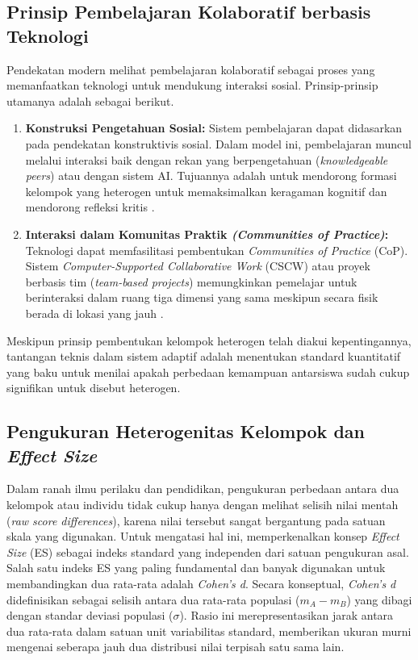 \subsection{Prinsip Pembelajaran Kolaboratif berbasis Teknologi}
\label{ssec:prinsip_cscl}
Pendekatan modern melihat pembelajaran
kolaboratif sebagai proses yang memanfaatkan teknologi untuk mendukung interaksi
sosial. Prinsip-prinsip utamanya adalah sebagai berikut.

\begin{enumerate}
    \item \textbf{Konstruksi Pengetahuan Sosial:} Sistem pembelajaran dapat didasarkan
    pada pendekatan konstruktivis sosial. Dalam model ini, pembelajaran muncul melalui
    interaksi baik dengan rekan yang berpengetahuan (\textit{knowledgeable peers})
    atau dengan sistem AI. Tujuannya adalah untuk mendorong formasi kelompok yang
    heterogen untuk memaksimalkan keragaman kognitif dan mendorong refleksi kritis
    \autocite{Halkiopoulos2024}.

    \item \textbf{Interaksi dalam Komunitas Praktik \textit{(Communities of Practice)}:
    } Teknologi dapat memfasilitasi pembentukan \textit{Communities of Practice} (CoP).
    Sistem \textit{Computer-Supported Collaborative Work} (CSCW) atau proyek berbasis
    tim (\textit{team-based projects}) memungkinkan pemelajar untuk berinteraksi
    dalam ruang tiga dimensi yang sama meskipun secara fisik berada di lokasi yang
    jauh \autocite{Ryoo2021}.
\end{enumerate}

Meskipun prinsip pembentukan kelompok heterogen telah diakui kepentingannya,
tantangan teknis dalam sistem adaptif adalah menentukan standard kuantitatif yang
baku untuk menilai apakah perbedaan kemampuan antarsiswa sudah cukup signifikan
untuk disebut heterogen.

\subsection{Pengukuran Heterogenitas Kelompok dan \textit{Effect Size}}

Dalam ranah ilmu perilaku dan pendidikan, pengukuran perbedaan antara dua \linebreak kelompok
atau individu tidak cukup hanya dengan melihat selisih nilai mentah (\textit{raw
score differences}), karena nilai tersebut sangat bergantung pada satuan skala
yang digunakan. Untuk mengatasi hal ini, \textcite{Cohen1988} memperkenalkan
konsep \textit{Effect Size} (ES) sebagai indeks standard yang independen dari
satuan pengukuran asal. Salah satu indeks ES yang paling fundamental dan banyak
digunakan untuk membandingkan dua rata-rata adalah \textit{Cohen's d}. Secara
konseptual, \textit{Cohen's d} didefinisikan sebagai selisih antara dua rata-rata
populasi ($m_A - m_B$) yang dibagi dengan standar deviasi populasi ($\sigma$).
Rasio ini merepresentasikan jarak antara dua rata-rata dalam satuan unit
variabilitas standard, memberikan ukuran murni mengenai seberapa jauh dua
distribusi nilai terpisah satu sama lain.

